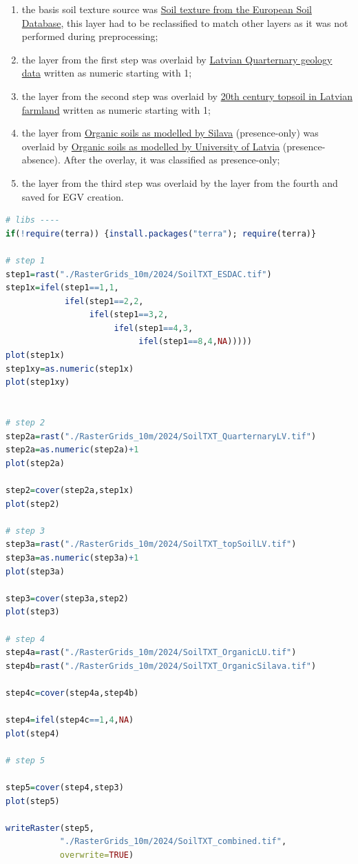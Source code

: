 \documentclass[
]{book}
\begin{document}
\begin{enumerate}
\def\labelenumi{\arabic{enumi}.}
\item
  the basis soil texture source was \hyperref[Ch04.07.02]{Soil texture from the European Soil Database},
  this layer had to be reclassified to match other layers as it was not performed
  during preprocessing;
\item
  the layer from the first step was overlaid by \hyperref[Ch04.07.04]{Latvian Quarternary geology data}
  written as numeric starting with 1;
\item
  the layer from the second step was overlaid by \hyperref[Ch04.07.03]{20th century topsoil in Latvian farmland}
  written as numeric starting with 1;
\item
  the layer from \hyperref[Ch04.07.05]{Organic soils as modelled by Silava} (presence-only)
  was overlaid by \hyperref[Ch04.07.06]{Organic soils as modelled by University of Latvia}
  (presence-absence). After the overlay, it was classified as presence-only;
\item
  the layer from the third step was overlaid by the layer from the fourth and
  saved for EGV creation.
\end{enumerate}

\begin{lstlisting}[language=R]
# libs ----
if(!require(terra)) {install.packages("terra"); require(terra)}

# step 1
step1=rast("./RasterGrids_10m/2024/SoilTXT_ESDAC.tif")
step1x=ifel(step1==1,1,
            ifel(step1==2,2,
                 ifel(step1==3,2,
                      ifel(step1==4,3,
                           ifel(step1==8,4,NA)))))
plot(step1x)
step1xy=as.numeric(step1x)
plot(step1xy)


# step 2
step2a=rast("./RasterGrids_10m/2024/SoilTXT_QuarternaryLV.tif")
step2a=as.numeric(step2a)+1
plot(step2a)

step2=cover(step2a,step1x)
plot(step2)

# step 3
step3a=rast("./RasterGrids_10m/2024/SoilTXT_topSoilLV.tif")
step3a=as.numeric(step3a)+1
plot(step3a)

step3=cover(step3a,step2)
plot(step3)

# step 4
step4a=rast("./RasterGrids_10m/2024/SoilTXT_OrganicLU.tif")
step4b=rast("./RasterGrids_10m/2024/SoilTXT_OrganicSilava.tif")

step4c=cover(step4a,step4b)

step4=ifel(step4c==1,4,NA)
plot(step4)

# step 5

step5=cover(step4,step3)
plot(step5)

writeRaster(step5,
           "./RasterGrids_10m/2024/SoilTXT_combined.tif",
           overwrite=TRUE)
\end{lstlisting}
\end{document}
